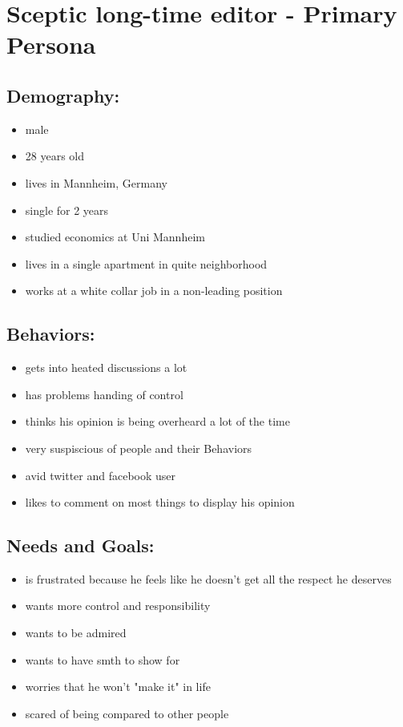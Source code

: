\documentclass{article}
\date{11.11.2015}
\begin{document}
\section{Sceptic long-time editor - Primary Persona}

\subsection{Demography:}
\begin{itemize}
 \item male
 \item 28 years old
 \item lives in Mannheim, Germany
 \item single for 2 years
 \item studied economics at Uni Mannheim
 \item lives in a single apartment in quite neighborhood
 \item works at a white collar job in a non-leading position
\end{itemize}

\subsection{Behaviors:}
\begin{itemize}
\item gets into heated discussions a lot
\item has problems handing of control
\item thinks his opinion is being overheard a lot of the time
\item very suspiscious of people and their Behaviors
\item avid twitter and facebook user
\item likes to comment on most things to display his opinion
\end{itemize}

\subsection{Needs and Goals:}
\begin{itemize}
 \item is frustrated because he feels like he doesn't get all the respect he deserves
 \item wants more control and responsibility
 \item wants to be admired
 \item wants to have smth to show for
 \item worries that he won't "make it" in life
 \item scared of being compared to other people
\end{itemize}
\end{document}
